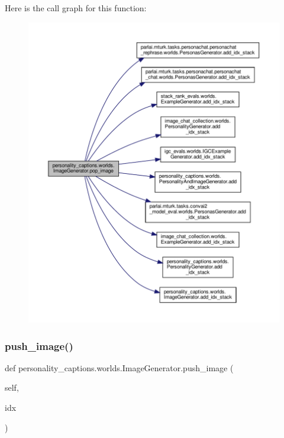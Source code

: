 Here is the call graph for this function\+:
\nopagebreak
\begin{figure}[H]
\begin{center}
\leavevmode
\includegraphics[width=350pt]{classpersonality__captions_1_1worlds_1_1ImageGenerator_a3ed9513ae59885f39f95a65d610b9b54_cgraph}
\end{center}
\end{figure}
\mbox{\label{classpersonality__captions_1_1worlds_1_1ImageGenerator_a78705bbcfdb530dc94ff25cc0aa7fd65}} 
\subsubsection{\texorpdfstring{push\+\_\+image()}{push\_image()}}
{\footnotesize\ttfamily def personality\+\_\+captions.\+worlds.\+Image\+Generator.\+push\+\_\+image (\begin{DoxyParamCaption}\item[{}]{self,  }\item[{}]{idx }\end{DoxyParamCaption})}



